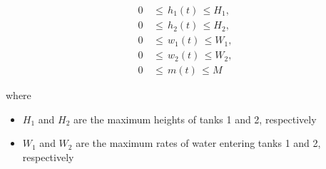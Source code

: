 \begin{align}
    0 \, & \leq \, h_1 (t) \, \leq H_1, \\
    0 \, & \leq \, h_2 (t) \, \leq H_2, \\
    0 \, & \leq \, w_1 (t) \, \leq W_1, \\
    0 \, & \leq \, w_2 (t) \, \leq W_2, \\
    0 \, & \leq \, m (t) \, \leq M
\end{align}

\noindent where

\begin{itemize}
    \item $H_1$ and $H_2$ are the maximum heights of tanks 1 and 2, respectively
    \item $W_1$ and $W_2$ are the maximum rates of water entering tanks 1 and 2, respectively
\end{itemize}
